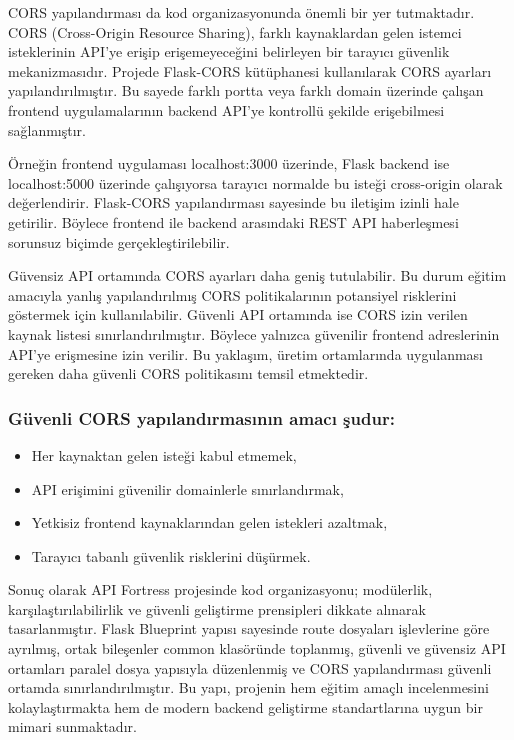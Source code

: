 CORS yapılandırması da kod organizasyonunda önemli bir yer tutmaktadır. CORS (Cross-Origin Resource Sharing), farklı kaynaklardan gelen istemci isteklerinin API’ye erişip erişemeyeceğini belirleyen bir tarayıcı güvenlik mekanizmasıdır. Projede Flask-CORS kütüphanesi kullanılarak CORS ayarları yapılandırılmıştır. Bu sayede farklı portta veya farklı domain üzerinde çalışan frontend uygulamalarının backend API’ye kontrollü şekilde erişebilmesi sağlanmıştır.

Örneğin frontend uygulaması localhost:3000 üzerinde, Flask backend ise localhost:5000 üzerinde çalışıyorsa tarayıcı normalde bu isteği cross-origin olarak değerlendirir. Flask-CORS yapılandırması sayesinde bu iletişim izinli hale getirilir. Böylece frontend ile backend arasındaki REST API haberleşmesi sorunsuz biçimde gerçekleştirilebilir.

Güvensiz API ortamında CORS ayarları daha geniş tutulabilir. Bu durum eğitim amacıyla yanlış yapılandırılmış CORS politikalarının potansiyel risklerini göstermek için kullanılabilir. Güvenli API ortamında ise CORS izin verilen kaynak listesi sınırlandırılmıştır. Böylece yalnızca güvenilir frontend adreslerinin API’ye erişmesine izin verilir. Bu yaklaşım, üretim ortamlarında uygulanması gereken daha güvenli CORS politikasını temsil etmektedir.

\subsubsection{Güvenli CORS yapılandırmasının amacı şudur:}

\begin{itemize}[leftmargin=*]
    \item Her kaynaktan gelen isteği kabul etmemek,
    \item API erişimini güvenilir domainlerle sınırlandırmak,
    \item Yetkisiz frontend kaynaklarından gelen istekleri azaltmak,
    \item Tarayıcı tabanlı güvenlik risklerini düşürmek.
\end{itemize}

Sonuç olarak API Fortress projesinde kod organizasyonu; modülerlik, karşılaştırılabilirlik ve güvenli geliştirme prensipleri dikkate alınarak tasarlanmıştır. Flask Blueprint yapısı sayesinde route dosyaları işlevlerine göre ayrılmış, ortak bileşenler common klasöründe toplanmış, güvenli ve güvensiz API ortamları paralel dosya yapısıyla düzenlenmiş ve CORS yapılandırması güvenli ortamda sınırlandırılmıştır. Bu yapı, projenin hem eğitim amaçlı incelenmesini kolaylaştırmakta hem de modern backend geliştirme standartlarına uygun bir mimari sunmaktadır.


\clearpage
